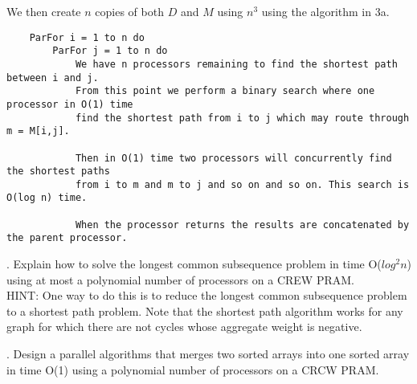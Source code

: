 \documentclass[10pt]{article}
\begin{document}
We then create $n$ copies of both $D$ and $M$ using $n^3$ using the algorithm in 3a. 
\begin{verbatim}
    ParFor i = 1 to n do
        ParFor j = 1 to n do
            We have n processors remaining to find the shortest path between i and j.
            From this point we perform a binary search where one processor in O(1) time
            find the shortest path from i to j which may route through m = M[i,j].

            Then in O(1) time two processors will concurrently find the shortest paths
            from i to m and m to j and so on and so on. This search is O(log n) time.
            
            When the processor returns the results are concatenated by the parent processor.
\end{verbatim}


. Explain how to solve the longest common subsequence problem in time O($log^2n$) using at most a
polynomial number of processors on a CREW PRAM.\\
HINT: One way to do this is to reduce the longest common subsequence problem to a shortest path
problem. Note that the shortest path algorithm works for any graph for which there are not cycles
whose aggregate weight is negative.

. Design a parallel algorithms that merges two sorted arrays into one sorted array in time O(1) using a
polynomial number of processors on a CRCW PRAM.
\end{document}
